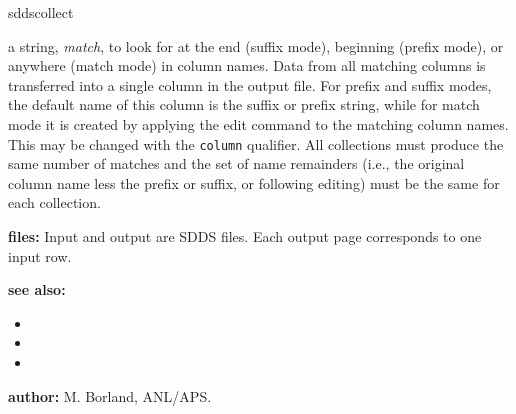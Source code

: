 \begin{sddsprog}{sddscollect}
\begin{itemize}
        a string, \emph{match}, to look for at the end (suffix mode), beginning (prefix mode), or
        anywhere (match mode) in column names. Data from all matching columns is transferred into a
        single column in the output file. For prefix and suffix modes, the default name of this
        column is the suffix or prefix string, while for match mode it is created by applying the
        edit command to the matching column names. This may be changed with the \verb|column|
        qualifier. All collections must produce the same number of matches and the set of name
        remainders (i.e., the original column name less the prefix or suffix, or following editing)
        must be the same for each collection.
    \end{itemize}
  \item \textbf{files:}
    Input and output are SDDS files. Each output page corresponds to one input row.
  \item \textbf{see also:}
    \begin{itemize}
      \item {}
      \item {}
      \item {}
    \end{itemize}
  \item \textbf{author:} M. Borland, ANL/APS.
\end{sddsprog}

